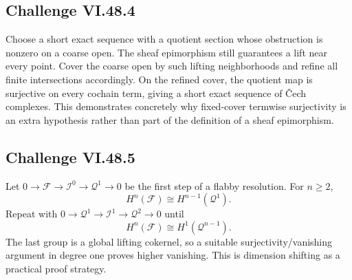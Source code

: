 \subsection*{Challenge VI.48.4}
\begin{solution}
Choose a short exact sequence with a quotient section whose obstruction is nonzero on a coarse open.  The sheaf epimorphism still guarantees a lift near every point.  Cover the coarse open by such lifting neighborhoods and refine all finite intersections accordingly.  On the refined cover, the quotient map is surjective on every cochain term, giving a short exact sequence of Čech complexes.  This demonstrates concretely why fixed-cover termwise surjectivity is an extra hypothesis rather than part of the definition of a sheaf epimorphism.
\end{solution}

\subsection*{Challenge VI.48.5}
\begin{solution}
Let \(0\to\mathcal F\to\mathcal I^0\to\mathcal Q^1\to0\) be the first step of a flabby resolution.  For \(n\ge2\),
\[
H^n(\mathcal F)\cong H^{n-1}(\mathcal Q^1).
\]
Repeat with \(0\to\mathcal Q^1\to\mathcal I^1\to\mathcal Q^2\to0\) until
\[
H^n(\mathcal F)\cong H^1(\mathcal Q^{n-1}).
\]
The last group is a global lifting cokernel, so a suitable surjectivity/vanishing argument in degree one proves higher vanishing.  This is dimension shifting as a practical proof strategy.
\end{solution}

